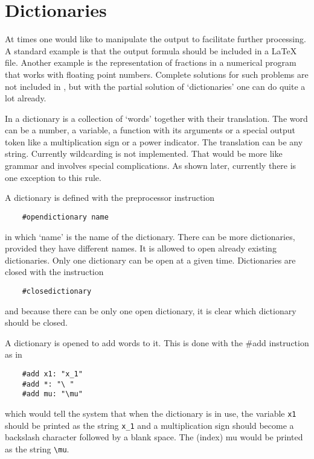 
\chapter{Dictionaries}
\label{dictionaries}

At times one would like to manipulate the output to facilitate further 
processing. A standard example is that the output formula should be 
included in a \LaTeX{} file. Another example is the representation of 
fractions in a numerical program that works with floating point numbers. 
Complete solutions for such problems are not included in \FORM{}, but with 
the partial solution of `dictionaries' one can do quite 
a lot already.

In \FORM{} a dictionary is a collection of `words' together with 
their translation. The word can be a number, a variable, 
a function with its arguments or a special output token like a 
multiplication sign or a power indicator. The translation can be any 
string. Currently wildcarding is not implemented. That would be more like 
grammar and involves special complications. As shown later, currently there 
is one exception to this rule.

A dictionary is defined with the preprocessor 
instruction
\begin{verbatim}
    #opendictionary name
\end{verbatim}
in which `name' is the name of the dictionary. There can be more 
dictionaries, provided they have different names. It is allowed to open 
already existing dictionaries. Only one dictionary can be open at a given 
time. Dictionaries are closed with the instruction
\begin{verbatim}
    #closedictionary
\end{verbatim}
and because there can be only one open dictionary, it is clear which 
dictionary should be closed.

A dictionary is opened to add words to it. This is done with the \#add 
instruction as in
\begin{verbatim}
    #add x1: "x_1"
    #add *: "\ "
    #add mu: "\mu"
\end{verbatim}
which would tell the system that when the dictionary is in use, the 
variable \verb:x1: should be printed as the string \verb:x_1: and a 
multiplication sign should become a backslash character followed by a 
blank space. The (index) mu would be printed as the string \verb:\mu:.

